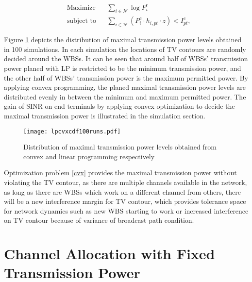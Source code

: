 	\begin{equation}
		\label{cvx}
		\begin{aligned}
		& {\text{Maximize}}
		& & \sum_{i\in \mathcal{N}} \log P^c_i \\
		& \text{subject to}
		& & \sum_{i\in \mathcal{N}} (P^c_i \cdot h_{i,pt}\cdot z) < I^c_{pt}, 
		\end{aligned}
	\end{equation}


Figure \ref{lpcvx} depicts the distribution of maximal transmission power levels obtained in 100 simulations. In each simulation the locations of TV contours are randomly decided around the WBSs. It can be seen that around half of WBSs' transmission power planed with LP is restricted to be the minimum transmission power, and the other half of WBSs' transmission power is the maximum permitted power. By applying convex programming, the planed maximal transmission power levels are distributed evenly in between the minimum and maximum permitted power. The gain of SINR on end terminals by applying convex optimization to decide the maximal transmission power is illustrated in the simulation section.

\begin{figure}[h!]
  \centering
  \texttt{[image: lpcvxcdf100runs.pdf]}
  \caption{Distribution of maximal transmission power levels obtained from convex and linear programming respectively}
\label{lpcvx}
\end{figure}


Optimization problem \ref{cvx} provides the maximal transmission power without violating the TV contour, as there are multiple channels available in the network, as long as there are WBSs which work on a different channel from others, there will be a new interference margin for TV contour, which provides tolerance space for network dynamics such as new WBS starting to work or increased interference on TV contour because of variance of broadcast path condition. 


\section{Channel Allocation with Fixed Transmission Power}
\label{CA_fixedPower_2subproblem}
